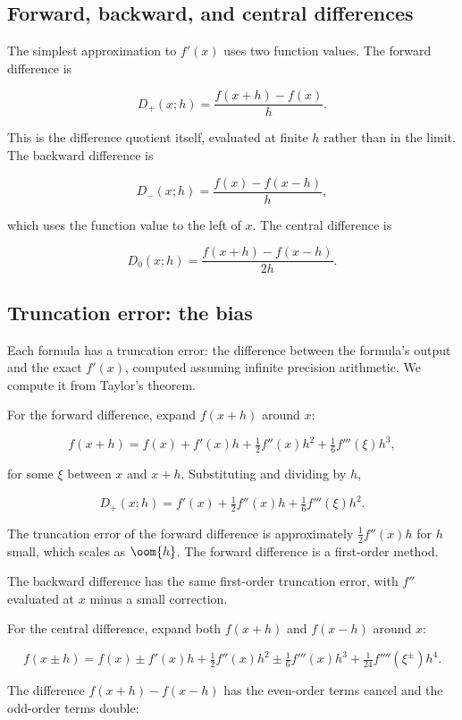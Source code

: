 \subsection{Forward, backward, and central differences}

The simplest approximation to $f'(x)$ uses two function values.
The forward difference is

\[
D_{+}(x; h) = \frac{f(x + h) - f(x)}{h}.
\]

This is the difference quotient itself, evaluated at finite $h$
rather than in the limit. The backward difference is

\[
D_{-}(x; h) = \frac{f(x) - f(x - h)}{h},
\]

which uses the function value to the left of $x$. The central
difference is

\[
D_{0}(x; h) = \frac{f(x + h) - f(x - h)}{2 h}.
\]

\subsection{Truncation error: the bias}

Each formula has a truncation error: the difference between the
formula's output and the exact $f'(x)$, computed assuming infinite
precision arithmetic. We compute it from Taylor's theorem.

For the forward difference, expand $f(x + h)$ around $x$:

\[
f(x + h) = f(x) + f'(x) h + \tfrac{1}{2} f''(x) h^{2} +
\tfrac{1}{6} f'''(\xi) h^{3},
\]

for some $\xi$ between $x$ and $x + h$. Substituting and dividing
by $h$,

\[
D_{+}(x; h) = f'(x) + \tfrac{1}{2} f''(x) h + \tfrac{1}{6}
f'''(\xi) h^{2}.
\]

The truncation error of the forward difference is approximately
$\tfrac{1}{2} f''(x) h$ for $h$ small, which scales as $\oom{h}$.
The forward difference is a first-order method.

The backward difference has the same first-order truncation error,
with $f''$ evaluated at $x$ minus a small correction.

For the central difference, expand both $f(x + h)$ and $f(x - h)$
around $x$:

\[
f(x \pm h) = f(x) \pm f'(x) h + \tfrac{1}{2} f''(x) h^{2} \pm
\tfrac{1}{6} f'''(x) h^{3} + \tfrac{1}{24} f''''(\xi^{\pm}) h^{4}.
\]

The difference $f(x + h) - f(x - h)$ has the even-order terms
cancel and the odd-order terms double:

